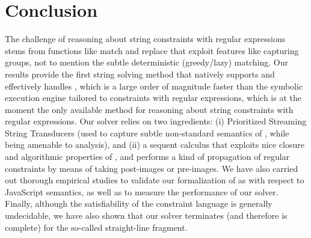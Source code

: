
\section{Conclusion}\label{sec-conc}
The challenge of reasoning about string constraints with regular expressions
stems from functions like match and replace that exploit features like capturing groups, not to mention the subtle deterministic
(greedy/lazy) matching. Our results provide the first string 
solving method that natively supports and effectively handles \regexp{}, which 
is a large order of magnitude faster than the symbolic execution engine 
\expose{} \cite{LMK19} tailored to constraints with regular expressions, 
which is at the moment the only available method for reasoning about string 
constraints with regular expressions. Our solver \ostrich{} relies on two ingredients: 
(i) Prioritized Streaming String Transducers (used to capture subtle non-standard
semantics of \regexp{}, while being amenable to analysis), and
(ii) a sequent calculus that exploits nice closure and algorithmic properties of
\PSST, and performs a kind of propagation of regular constraints by means of 
taking post-images or pre-images. We have also carried out thorough empirical studies
to validate our formalization of \regexp{} as {\PSST} with respect to JavaScript
semantics, as well as to measure the performance of our solver.
Finally, although the satisfiability of the constraint language is generally 
undecidable, we have also shown that our solver terminates (and therefore is
complete) for the so-called straight-line fragment.





 

